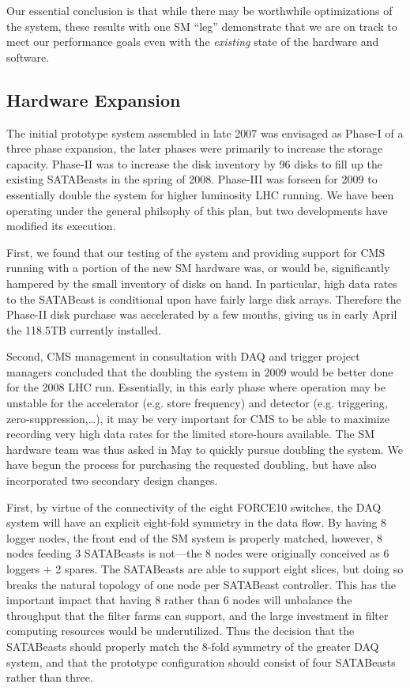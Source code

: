 Our essential conclusion is that while there may be worthwhile optimizations 
of the system, these results with one SM ``leg'' demonstrate that we are on track
to meet our performance goals even with the {\it existing}
state of the hardware and software.


\subsection{Hardware Expansion\label{sec:SMexpansion}}

The initial prototype system assembled in late 2007 was envisaged as Phase-I 
of a three phase expansion, the later phases were primarily to increase the
storage capacity.
Phase-II was to increase the disk inventory by 96 disks to fill up the existing
SATABeasts in the spring of 2008.
Phase-III was forseen for 2009 to essentially double the system for higher 
luminosity LHC running.
We have been operating under the general philsophy of this plan, 
but two developments have modified its execution.

First, we found that our testing of the system and providing support for CMS
running with a portion of the new SM hardware was, or would be, significantly hampered 
by the small inventory of disks on hand.
In particular, high data rates to the SATABeast is conditional upon have
fairly large disk arrays.
Therefore the Phase-II disk purchase was accelerated by a few months,
giving us in early April the 118.5TB currently installed.

Second, CMS management in consultation with DAQ and trigger
project managers concluded that the doubling the system in 2009 would be
better done  for the 2008 LHC run.
Essentially, in this early phase where operation may be unstable 
for the accelerator (e.g. store frequency)
and detector (e.g. triggering, zero-suppression,\ldots), 
it may be very important for CMS to be able to maximize  recording very high data rates
for the limited store-hours available.
The SM hardware team  was thus asked in May to quickly pursue doubling the system.
We have begun the process for purchasing the requested doubling, 
but have also incorporated two secondary design changes.

First, by virtue of the connectivity of the eight FORCE10 switches, the DAQ system
will have an explicit eight-fold symmetry in the data flow.
By having 8 logger nodes, the front end of the SM system is properly matched,
however, 8 nodes feeding 3 SATABeasts is not---the 8 nodes were originally 
conceived as 6 loggers $+$ 2 spares.
The SATABeasts are able to support eight slices,
but doing so breaks the natural topology of one node per  SATABeast controller.
This has the important impact that having 8 rather than 6 nodes will unbalance 
the throughput that the filter farms 
can support, and  the large investment in filter computing resources would be underutilized.
Thus the decision that the  SATABeasts should properly match the 8-fold symmetry
of the greater DAQ system, and that the prototype  configuration should consist
of four  SATABeasts rather than three.

